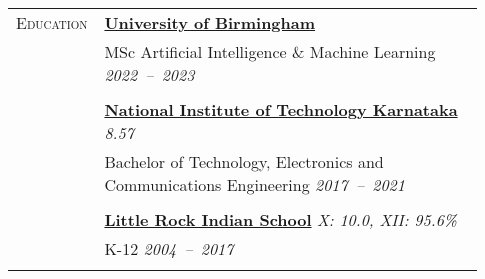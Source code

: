 \documentclass[letterpaper, 10pt, oneside]{article}
\newcommand{\stitle}[1]{\normalsize{\textsc{#1}}}
\begin{document}
\begin{longtable}{@{} p{0.13\linewidth} p{0.8\linewidth}}
    \stitle{Education}   & \textbf{\href{https://birmingham.ac.uk}{University of Birmingham}}                                                                                                                                   \\
                         & MSc Artificial Intelligence \& Machine Learning \hfill \textsl{2022\ --\ 2023}                                                                                                                       \\
    \\[-1.8ex]
                         & \textbf{\href{https://nitk.ac.in}{National Institute of Technology Karnataka}} \hfill \textsl{8.57}                                                                                                  \\
                         & Bachelor of Technology, Electronics and Communications Engineering \hfill \hspace{-3em} \textsl{2017\ --\ 2021}                                                                                      \\
    \\[-1.8ex]
                         & \textbf{\href{https://littlerock.edu.in}{Little Rock Indian School}} \hfill \textsl{X: 10.0, XII: 95.6\%}                                                                                            \\
                         & K-12 \hfill \textsl{2004\ --\ 2017}                                                                                                                                                                  \\
    \\



\end{longtable}
\end{document}
